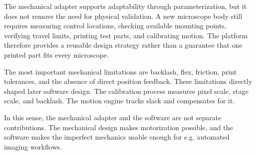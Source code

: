The mechanical adapter supports adaptability through parameterization, but it does not remove the need for physical validation. A new microscope body still requires measuring control locations, checking available mounting points, verifying travel limits, printing test parts, and calibrating motion. The platform therefore provides a reusable design strategy rather than a guarantee that one printed part fits every microscope.

The most important mechanical limitations are backlash, flex, friction, print tolerances, and the absence of direct position feedback. These limitations directly shaped later software design. The calibration process measures pixel scale, stage scale, and backlash. The motion engine tracks slack and compensates for it.

In this sense, the mechanical adapter and the software are not separate contributions. The mechanical design makes motorization possible, and the software makes the imperfect mechanics usable enough for e.g. automated imaging workflows.
